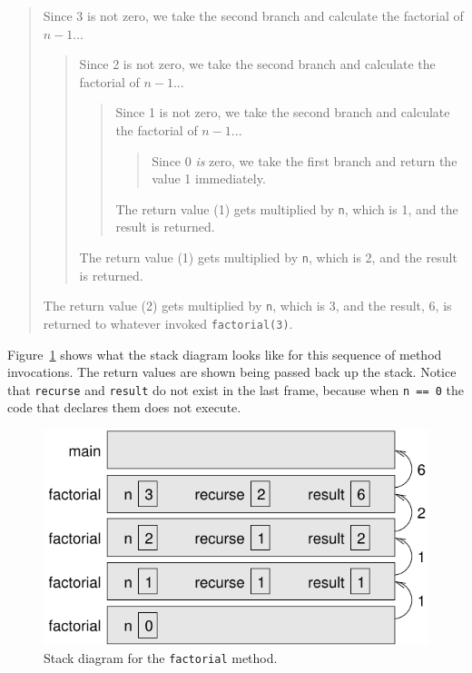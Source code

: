 \documentclass[12pt]{book}
\theoremstyle{exercise}
\newcommand{\java}[1]{\verb"#1"}
\begin{document}
\vspace{-1ex}
\begin{quote}
Since 3 is not zero, we take the second branch and calculate the factorial of $n-1$...
\begin{quote}
Since 2 is not zero, we take the second branch and calculate the factorial of $n-1$...
\begin{quote}
Since 1 is not zero, we take the second branch and calculate the factorial of $n-1$...
\begin{quote}
Since 0 {\em is} zero, we take the first branch and return the value 1 immediately.
\end{quote}
The return value (1) gets multiplied by \java{n}, which is 1, and the result is returned.
\end{quote}
The return value (1) gets multiplied by \java{n}, which is 2, and the result is returned.
\end{quote}
The return value (2) gets multiplied by \java{n}, which is 3, and the result, 6, is returned to whatever invoked \java{factorial(3)}.
\end{quote}
\vspace{-1ex}


Figure~\ref{fig:stack3} shows what the stack diagram looks like for this sequence of method invocations.
The return values are shown being passed back up the stack.
Notice that \java{recurse} and \java{result} do not exist in the last frame, because when \java{n == 0} the code that declares them does not execute.

\begin{figure}[!ht]
\begin{center}
\includegraphics{figs/stack3.pdf}
\caption{Stack diagram for the \java{factorial} method.}
\label{fig:stack3}
\end{center}
\end{figure}
\end{document}
